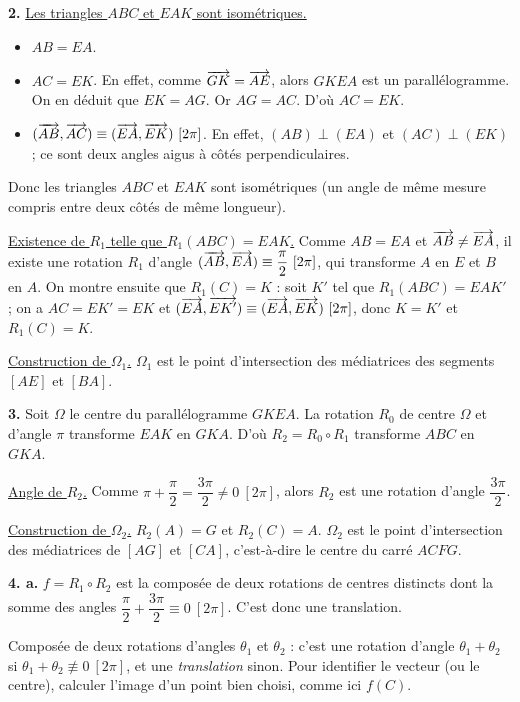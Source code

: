 \documentclass[11pt]{article}
\begin{document}
\textbf{2.} \underline{Les triangles $ABC$ et $EAK$ sont isométriques.}
\begin{itemize}
  \item $AB = EA$.
  \item $AC = EK$. En effet, comme $\overrightarrow{GK} = \overrightarrow{AE}$, alors $GKEA$ est un parallélogramme. On en déduit que $EK = AG$. Or $AG = AC$. D'où $AC = EK$.
  \item $(\overrightarrow{AB}, \overrightarrow{AC}) \equiv (\overrightarrow{EA}, \overrightarrow{EK})\ [2\pi]$. En effet, $(AB) \perp (EA)$ et $(AC) \perp (EK)$ ; ce sont deux angles aigus à côtés perpendiculaires.
\end{itemize}
Donc les triangles $ABC$ et $EAK$ sont isométriques (un angle de même mesure compris entre deux côtés de même longueur).

\underline{Existence de $R_1$ telle que $R_1(ABC) = EAK$.} Comme $AB = EA$ et $\overrightarrow{AB} \ne \overrightarrow{EA}$, il existe une rotation $R_1$ d'angle $(\overrightarrow{AB}, \overrightarrow{EA}) \equiv \dfrac{\pi}{2}\ [2\pi]$, qui transforme $A$ en $E$ et $B$ en $A$. On montre ensuite que $R_1(C) = K$ : soit $K'$ tel que $R_1(ABC) = EAK'$ ; on a $AC = EK' = EK$ et $(\overrightarrow{EA}, \overrightarrow{EK'}) \equiv (\overrightarrow{EA}, \overrightarrow{EK})\ [2\pi]$, donc $K = K'$ et $R_1(C) = K$.

\underline{Construction de $\Omega_1$.} $\Omega_1$ est le point d'intersection des médiatrices des segments $[AE]$ et $[BA]$.

\textbf{3.} Soit $\Omega$ le centre du parallélogramme $GKEA$. La rotation $R_0$ de centre $\Omega$ et d'angle $\pi$ transforme $EAK$ en $GKA$. D'où $R_2 = R_0 \circ R_1$ transforme $ABC$ en $GKA$.

\underline{Angle de $R_2$.} Comme $\pi + \dfrac{\pi}{2} = \dfrac{3\pi}{2} \ne 0\ [2\pi]$, alors $R_2$ est une rotation d'angle $\dfrac{3\pi}{2}$.

\underline{Construction de $\Omega_2$.} $R_2(A) = G$ et $R_2(C) = A$. $\Omega_2$ est le point d'intersection des médiatrices de $[AG]$ et $[CA]$, c'est-à-dire le centre du carré $ACFG$.

\textbf{4. a.} $f = R_1 \circ R_2$ est la composée de deux rotations de centres distincts dont la somme des angles $\dfrac{\pi}{2} + \dfrac{3\pi}{2} \equiv 0\ [2\pi]$. C'est donc une translation.

\begin{rappel}
Composée de deux rotations d'angles $\theta_1$ et $\theta_2$ : c'est une
rotation d'angle $\theta_1 + \theta_2$ si
$\theta_1 + \theta_2 \not\equiv 0\ [2\pi]$, et une \emph{translation}
sinon. Pour identifier le vecteur (ou le centre), calculer l'image d'un
point bien choisi, comme ici $f(C)$.
\end{rappel}
\end{document}
